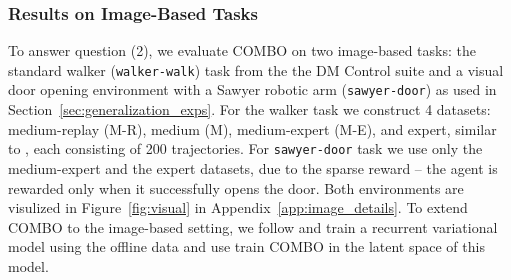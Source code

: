 

\vspace{-0.2cm}
\subsubsection{Results on Image-Based Tasks}
\vspace{-0.2cm}
To answer question (2), we evaluate COMBO on two image-based tasks: the standard walker (\texttt{walker-walk}) task from the the DM Control suite \cite{tassa2018deepmind} and a visual door opening environment with a Sawyer robotic arm (\texttt{sawyer-door}) as used in Section~\ref{sec:generalization_exps}. For the walker task we construct 4 datasets: medium-replay (M-R), medium (M), medium-expert (M-E), and expert, similar to \citet{fu2020d4rl}, each consisting of 200 trajectories. For \texttt{sawyer-door} task we use only the medium-expert and the expert datasets, due to the sparse reward -- the agent is rewarded only when it successfully opens the door. Both environments are visulized in Figure~\ref{fig:visual} in Appendix~\ref{app:image_details}. To extend COMBO to the image-based setting, we follow \citet{Rafailov2020LOMPO} and train a recurrent variational model using the offline data and use train COMBO in the latent space of this model.

